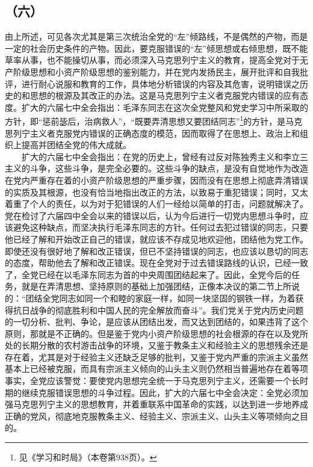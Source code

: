\documentclass[cn,11pt,chinese]{elegantbook}
\def\myformat#1{\hfil\hfil #1}
\begin{document}
\subsection*{\myformat{（六）}}
由上所述，可见各次尤其是第三次统治全党的“左”倾路线，不是偶然的产物，而是一定的社会历史条件的产物。因此，要克服错误的“左”倾思想或右倾思想，既不能草率从事，也不能操切从事，而必须深入马克思列宁主义的教育，提高全党对于无产阶级思想和小资产阶级思想的鉴别能力，并在党内发扬民主，展开批评和自我批评，进行耐心说服和教育的工作，具体地分析错误的内容及其危害，说明错误之历史的和思想的根源及其改正的办法。这是马克思列宁主义者克服党内错误的应有态度。扩大的六届七中全会指出：毛泽东同志在这次全党整风和党史学习中所采取的方针，即“惩前毖后，治病救人”，“既要弄清思想又要团结同志”\footnote[49]{ 见《学习和时局》（本卷第938页）。
}的方针，是马克思列宁主义者克服党内错误的正确态度的模范，因而取得了在思想上、政治上和组织上提高并团结全党的伟大成就。\\
　　扩大的六届七中全会指出：在党的历史上，曾经有过反对陈独秀主义和李立三主义的斗争，这些斗争，是完全必要的。这些斗争的缺点，是没有自觉地作为改造在党内严重存在着的小资产阶级思想的严重步骤，因而没有在思想上彻底弄清错误的实质及其根源，也没有恰当地指出改正的方法，以致易于重犯错误；同时，又太着重了个人的责任，以为对于犯错误的人们一经给以简单的打击，问题就解决了。党在检讨了六届四中全会以来的错误以后，认为今后进行一切党内思想斗争时，应该避免这种缺点，而坚决执行毛泽东同志的方针。任何过去犯过错误的同志，只要他已经了解和开始改正自己的错误，就应该不存成见地欢迎他，团结他为党工作。即使还没有很好地了解和改正错误，但已不坚持错误的同志，也应该以恳切的同志的态度，帮助他去了解和改正错误。现在全党对于过去错误路线的认识，已经一致了，全党已经在以毛泽东同志为首的中央周围团结起来了。因此，全党今后的任务，就是在弄清思想、坚持原则的基础上加强团结，正像本决议的第二节上所说的：“团结全党同志如同一个和睦的家庭一样，如同一块坚固的钢铁一样，为着获得抗日战争的彻底胜利和中国人民的完全解放而奋斗”。我们党关于党内历史问题的一切分析、批判、争论，是应该从团结出发，而又达到团结的，如果违背了这个原则，那就是不正确的。但是鉴于党内小资产阶级思想的社会根源的存在以及党所处的长期分散的农村游击战争的环境，又鉴于教条主义和经验主义的思想残余还是存在着，尤其是对于经验主义还缺乏足够的批判，又鉴于党内严重的宗派主义虽然基本上已经被克服，而具有宗派主义倾向的山头主义则仍然相当普遍地存在着等项事实，全党应该警觉：要使党内思想完全统一于马克思列宁主义，还需要一个长时期的继续克服错误思想的斗争过程。因此，扩大的六届七中全会决定：全党必须加强马克思列宁主义的思想教育，并着重联系中国革命的实践，以达到进一步地养成正确的党风，彻底地克服教条主义、经验主义、宗派主义、山头主义等项倾向之目的。\\
\end{document}
